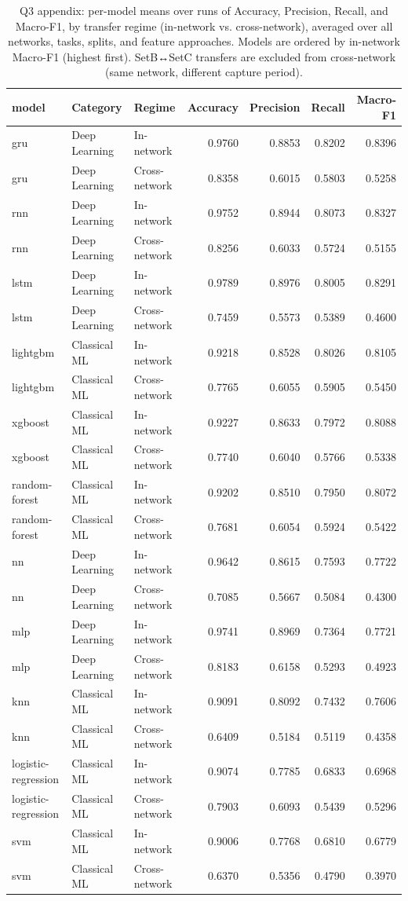 \begin{table}
\caption{Q3 appendix: per-model means over runs of Accuracy, Precision, Recall, and Macro-F1, by transfer regime (in-network vs. cross-network), averaged over all networks, tasks, splits, and feature approaches. Models are ordered by in-network Macro-F1 (highest first). SetB↔SetC transfers are excluded from cross-network (same network, different capture period).}
\label{tab:q3_appendix_per_model}
\begin{tabular}{lllrrrr}
\toprule
model & Category & Regime & Accuracy & Precision & Recall & Macro-F1 \\
\midrule
gru & Deep Learning & In-network & 0.9760 & 0.8853 & 0.8202 & 0.8396 \\
gru & Deep Learning & Cross-network & 0.8358 & 0.6015 & 0.5803 & 0.5258 \\
rnn & Deep Learning & In-network & 0.9752 & 0.8944 & 0.8073 & 0.8327 \\
rnn & Deep Learning & Cross-network & 0.8256 & 0.6033 & 0.5724 & 0.5155 \\
lstm & Deep Learning & In-network & 0.9789 & 0.8976 & 0.8005 & 0.8291 \\
lstm & Deep Learning & Cross-network & 0.7459 & 0.5573 & 0.5389 & 0.4600 \\
lightgbm & Classical ML & In-network & 0.9218 & 0.8528 & 0.8026 & 0.8105 \\
lightgbm & Classical ML & Cross-network & 0.7765 & 0.6055 & 0.5905 & 0.5450 \\
xgboost & Classical ML & In-network & 0.9227 & 0.8633 & 0.7972 & 0.8088 \\
xgboost & Classical ML & Cross-network & 0.7740 & 0.6040 & 0.5766 & 0.5338 \\
random-forest & Classical ML & In-network & 0.9202 & 0.8510 & 0.7950 & 0.8072 \\
random-forest & Classical ML & Cross-network & 0.7681 & 0.6054 & 0.5924 & 0.5422 \\
nn & Deep Learning & In-network & 0.9642 & 0.8615 & 0.7593 & 0.7722 \\
nn & Deep Learning & Cross-network & 0.7085 & 0.5667 & 0.5084 & 0.4300 \\
mlp & Deep Learning & In-network & 0.9741 & 0.8969 & 0.7364 & 0.7721 \\
mlp & Deep Learning & Cross-network & 0.8183 & 0.6158 & 0.5293 & 0.4923 \\
knn & Classical ML & In-network & 0.9091 & 0.8092 & 0.7432 & 0.7606 \\
knn & Classical ML & Cross-network & 0.6409 & 0.5184 & 0.5119 & 0.4358 \\
logistic-regression & Classical ML & In-network & 0.9074 & 0.7785 & 0.6833 & 0.6968 \\
logistic-regression & Classical ML & Cross-network & 0.7903 & 0.6093 & 0.5439 & 0.5296 \\
svm & Classical ML & In-network & 0.9006 & 0.7768 & 0.6810 & 0.6779 \\
svm & Classical ML & Cross-network & 0.6370 & 0.5356 & 0.4790 & 0.3970 \\
\bottomrule
\end{tabular}
\end{table}
